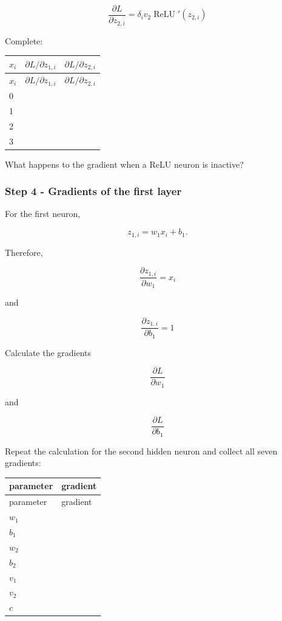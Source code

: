 \documentclass{course_sheet}
\begin{document}
\[
\frac{\partial L}{\partial z_{2,i}}=\delta_i v_2\operatorname{ReLU}'(z_{2,i})
\]

Complete:

\begingroup
\small
\setlength{\tabcolsep}{4pt}
\begin{longtable}{l|l|l}
$x_i$ & $\partial L/\partial z_{1,i}$ & $\partial L/\partial z_{2,i}$ \\[1.5pt]
\hline
\endfirsthead
$x_i$ & $\partial L/\partial z_{1,i}$ & $\partial L/\partial z_{2,i}$ \\[1.5pt]
\hline
\endhead
\rule{0pt}{2.4ex}0 &  $\phantom{-0.00}$ &  $\phantom{-0.00}$ \\[3pt]
\rule{0pt}{2.4ex}1 &  $\phantom{-0.00}$ &  $\phantom{-0.00}$ \\[3pt]
\rule{0pt}{2.4ex}2 &  $\phantom{-0.00}$ &  $\phantom{-0.00}$ \\[3pt]
\rule{0pt}{2.4ex}3 &  $\phantom{-0.00}$ &  $\phantom{-0.00}$ \\[3pt]
\end{longtable}
\endgroup
What happens to the gradient when a ReLU neuron is inactive?

\subsubsection*{Step 4 - Gradients of the first layer}
For the first neuron,

\[
z_{1,i}=w_1x_i+b_1.
\]

Therefore,

\[
\frac{\partial z_{1,i}}{\partial w_1}=x_i
\]

and

\[
\frac{\partial z_{1,i}}{\partial b_1}=1
\]

Calculate the gradients

\[
\frac{\partial L}{\partial w_1}
\]

and

\[
\frac{\partial L}{\partial b_1}
\]

Repeat the calculation for the second hidden neuron and collect all seven gradients:

\begingroup
\small
\setlength{\tabcolsep}{4pt}
\begin{longtable}{l|l}
parameter & gradient \\[1.5pt]
\hline
\endfirsthead
parameter & gradient \\[1.5pt]
\hline
\endhead
\rule{0pt}{2.4ex}$w_1$ &  $\phantom{-0.00}$ \\[3pt]
\rule{0pt}{2.4ex}$b_1$ &  $\phantom{-0.00}$ \\[3pt]
\rule{0pt}{2.4ex}$w_2$ &  $\phantom{-0.00}$ \\[3pt]
\rule{0pt}{2.4ex}$b_2$ &  $\phantom{-0.00}$ \\[3pt]
\rule{0pt}{2.4ex}$v_1$ &  $\phantom{-0.00}$ \\[3pt]
\rule{0pt}{2.4ex}$v_2$ &  $\phantom{-0.00}$ \\[3pt]
\rule{0pt}{2.4ex}$c$ &  $\phantom{-0.00}$ \\[3pt]
\end{longtable}
\endgroup
\end{document}
